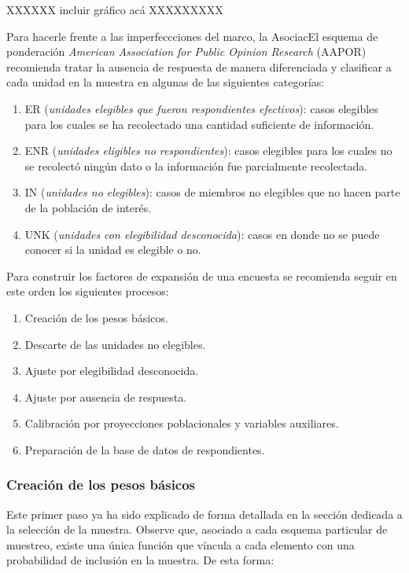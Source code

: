 XXXXXX incluir gráfico acá XXXXXXXXX

Para hacerle frente a las imperfeccciones del marco, la AsociacEl esquema de ponderación \emph{American Association for Public Opinion Research} (AAPOR) recomienda tratar la ausencia de respuesta de manera diferenciada y clasificar a cada unidad en la muestra en algunas de las siguientes categorías:

\begin{enumerate}
\def\labelenumi{\arabic{enumi}.}
\tightlist
\item
  ER (\emph{unidades elegibles que fueron respondientes efectivos}): casos elegibles para los cuales se ha recolectado una cantidad suficiente de información.
\item
  ENR (\emph{unidades eligibles no respondientes}): casos elegibles para los cuales no se recolectó ningún dato o la información fue parcialmente recolectada.
\item
  IN (\emph{unidades no elegibles}): casos de miembros no elegibles que no hacen parte de la población de interés.
\item
  UNK (\emph{unidades con elegibilidad desconocida}): casos en donde no se puede conocer si la unidad es elegible o no.
\end{enumerate}

Para construir los factores de expansión de una encuesta se recomienda seguir en este orden los siguientes procesos:

\begin{enumerate}
\def\labelenumi{\arabic{enumi}.}
\tightlist
\item
  Creación de los pesos básicos.
\item
  Descarte de las unidades no elegibles.
\item
  Ajuste por elegibilidad desconocida.
\item
  Ajuste por ausencia de respuesta.
\item
  Calibración por proyecciones poblacionales y variables auxiliares.
\item
  Preparación de la base de datos de respondientes.
\end{enumerate}

\hypertarget{creacion-de-los-pesos-basicos}{%
\subsubsection*{Creación de los pesos básicos}\label{creacion-de-los-pesos-basicos}}


Este primer paso ya ha sido explicado de forma detallada en la sección dedicada a la selección de la muestra. Observe que, asociado a cada esquema particular de muestreo, existe una única función que víncula a cada elemento con una probabilidad de inclusión en la muestra. De esta forma:


